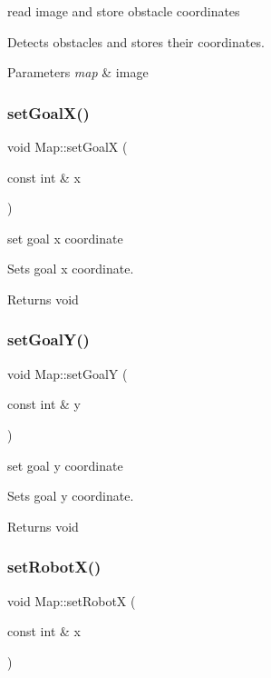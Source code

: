 read image and store obstacle coordinates 

Detects obstacles and stores their coordinates.


\begin{DoxyParams}{Parameters}
{\em map} & image \\
\hline
\end{DoxyParams}
\mbox{\label{classMap_a7f0ac3c595d6e3a7e94b6240e43f136c}} 
\subsubsection{\texorpdfstring{set\+Goal\+X()}{setGoalX()}}
{\footnotesize\ttfamily void Map\+::set\+GoalX (\begin{DoxyParamCaption}\item[{const int \&}]{x }\end{DoxyParamCaption})}



set goal x coordinate 

Sets goal x coordinate.

\begin{DoxyReturn}{Returns}
void 
\end{DoxyReturn}
\mbox{\label{classMap_a3d97fd965cd71e4b103c383fea065f41}} 
\subsubsection{\texorpdfstring{set\+Goal\+Y()}{setGoalY()}}
{\footnotesize\ttfamily void Map\+::set\+GoalY (\begin{DoxyParamCaption}\item[{const int \&}]{y }\end{DoxyParamCaption})}



set goal y coordinate 

Sets goal y coordinate.

\begin{DoxyReturn}{Returns}
void 
\end{DoxyReturn}
\mbox{\label{classMap_ac170da40163e9ecda653d63b7c0e8cae}} 
\subsubsection{\texorpdfstring{set\+Robot\+X()}{setRobotX()}}
{\footnotesize\ttfamily void Map\+::set\+RobotX (\begin{DoxyParamCaption}\item[{const int \&}]{x }\end{DoxyParamCaption})}




